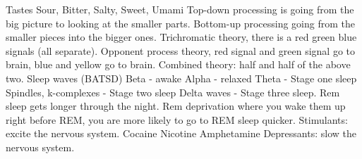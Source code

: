\markdownRendererUlItem Tastes\markdownRendererInterblockSeparator
{}\markdownRendererUlBeginTight
\markdownRendererUlItem Sour, Bitter, Salty, Sweet, Umami\markdownRendererUlItemEnd 
\markdownRendererUlEndTight \markdownRendererUlItemEnd 
\markdownRendererUlItem Top-down processing is going from the big picture to looking at the smaller parts.\markdownRendererUlItemEnd 
\markdownRendererUlItem Bottom-up processing going from the smaller pieces into the bigger ones.\markdownRendererUlItemEnd 
\markdownRendererUlEndTight \markdownRendererInterblockSeparator
{}\markdownRendererInterblockSeparator
{}\markdownRendererUlBeginTight
\markdownRendererUlItem Trichromatic theory, there is a red green blue signals (all separate).\markdownRendererUlItemEnd 
\markdownRendererUlItem Opponent process theory, red signal and green signal go to brain, blue and yellow go to brain.\markdownRendererUlItemEnd 
\markdownRendererUlItem Combined theory: half and half of the above two.\markdownRendererUlItemEnd 
\markdownRendererUlEndTight \markdownRendererInterblockSeparator
{}\markdownRendererInterblockSeparator
{}\markdownRendererUlBeginTight
\markdownRendererUlItem Sleep waves (BATSD)\markdownRendererInterblockSeparator
{}\markdownRendererUlBeginTight
\markdownRendererUlItem Beta - awake\markdownRendererUlItemEnd 
\markdownRendererUlItem Alpha - relaxed\markdownRendererUlItemEnd 
\markdownRendererUlItem Theta - Stage one sleep\markdownRendererUlItemEnd 
\markdownRendererUlItem Spindles, k-complexes - Stage two sleep\markdownRendererUlItemEnd 
\markdownRendererUlItem Delta waves - Stage three sleep.\markdownRendererUlItemEnd 
\markdownRendererUlEndTight \markdownRendererUlItemEnd 
\markdownRendererUlItem Rem sleep gets longer through the night.\markdownRendererUlItemEnd 
\markdownRendererUlItem Rem deprivation where you wake them up right before REM, you are more likely to go to REM sleep quicker.\markdownRendererUlItemEnd 
\markdownRendererUlEndTight \markdownRendererInterblockSeparator
{}\markdownRendererInterblockSeparator
{}\markdownRendererUlBegin
\markdownRendererUlItem Stimulants: excite the nervous system.\markdownRendererInterblockSeparator
{}\markdownRendererUlBeginTight
\markdownRendererUlItem Cocaine\markdownRendererUlItemEnd 
\markdownRendererUlItem Nicotine\markdownRendererUlItemEnd 
\markdownRendererUlItem Amphetamine\markdownRendererUlItemEnd 
\markdownRendererUlEndTight \markdownRendererUlItemEnd 
\markdownRendererUlItem Depressants: slow the nervous system.\markdownRendererInterblockSeparator
